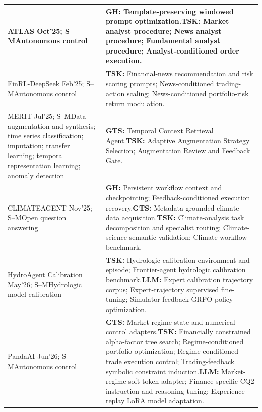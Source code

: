 \documentclass[preprints,article,submit,moreauthors]{Definitions/mdpi}
\newcommand{\typeSMshort}{\textsf{S--M}}
\begin{document}
\begin{longtable}{@{}>{\raggedright\arraybackslash}p{}p{}@{}}
ATLAS \citep{atlas2025} Oct'25; \typeSMshort{}\newline Autonomous control & \textbf{GH:} Template-preserving windowed prompt optimization.\newline\textbf{TSK:} Market analyst procedure; News analyst procedure; Fundamental analyst procedure; Analyst-conditioned order execution.\\\midrule
FinRL-DeepSeek \citep{finrldeepseek2025} Feb'25; \typeSMshort{}\newline Autonomous control & \textbf{TSK:} Financial-news recommendation and risk scoring prompts; News-conditioned trading-action scaling; News-conditioned portfolio-risk return modulation.\\\midrule
MERIT \citep{merit2025} Jul'25; \typeSMshort{}\newline Data augmentation and synthesis; time series classification; imputation; transfer learning; temporal representation learning; anomaly detection & \textbf{GTS:} Temporal Context Retrieval Agent.\newline\textbf{TSK:} Adaptive Augmentation Strategy Selection; Augmentation Review and Feedback Gate.\\\midrule
CLIMATEAGENT \citep{climateagent2025} Nov'25; \typeSMshort{}\newline Open question answering & \textbf{GH:} Persistent workflow context and checkpointing; Feedback-conditioned execution recovery.\newline\textbf{GTS:} Metadata-grounded climate data acquisition.\newline\textbf{TSK:} Climate-analysis task decomposition and specialist routing; Climate-science semantic validation; Climate workflow benchmark.\\\midrule
HydroAgent Calibration \citep{hydroagentcalibration2026} May'26; \typeSMshort{}\newline Hydrologic model calibration & \textbf{TSK:} Hydrologic calibration environment and episode; Frontier-agent hydrologic calibration benchmark.\newline\textbf{LLM:} Expert calibration trajectory corpus; Expert-trajectory supervised fine-tuning; Simulator-feedback GRPO policy optimization.\\\midrule
PandaAI \citep{pandaai2026} Jun'26; \typeSMshort{}\newline Autonomous control & \textbf{GTS:} Market-regime state and numerical control adapters.\newline\textbf{TSK:} Financially constrained alpha-factor tree search; Regime-conditioned portfolio optimization; Regime-conditioned trade execution control; Trading-feedback symbolic constraint induction.\newline\textbf{LLM:} Market-regime soft-token adapter; Finance-specific CQ2 instruction and reasoning tuning; Experience-replay LoRA model adaptation.\\\midrule

\end{longtable}
\end{document}
